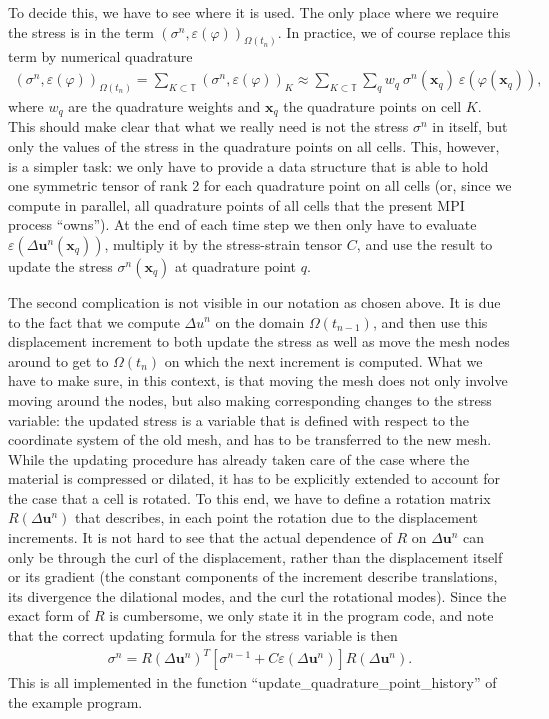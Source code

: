 \documentclass{article}
\renewcommand{\vec}[1]{\mathbf{#1}}
\begin{document}
To decide this, we have to see where it is used. The only place where we
require the stress is in the term
$(\sigma^n,\varepsilon(\varphi))_{\Omega(t_n)}$. In practice, we of
course replace this term by numerical quadrature
\begin{gather*}
  (\sigma^n,\varepsilon(\varphi))_{\Omega(t_n)}
  =
  \sum_{K\subset {\mathbb T}}
  (\sigma^n,\varepsilon(\varphi))_K
  \approx
  \sum_{K\subset {\mathbb T}}
  \sum_q
  w_q \ \sigma^n(\vec x_q) \ \varepsilon(\varphi(\vec x_q)),
\end{gather*}
where $w_q$ are the quadrature weights and $\vec x_q$ the quadrature points on
cell $K$. This should make clear that what we really need is not the stress
$\sigma^n$ in itself, but only the values of the stress in the quadrature
points on all cells. This, however, is a simpler task: we only have to provide
a data structure that is able to hold one symmetric tensor of rank 2 for each
quadrature point on all cells (or, since we compute in parallel, all
quadrature points of all cells that the present MPI process ``owns''). At the
end of each time step we then only have to evaluate $\varepsilon(\Delta \vec
u^n(\vec x_q))$, multiply it by the stress-strain tensor $C$, and use the
result to update the stress $\sigma^n(\vec x_q)$ at quadrature point $q$.

The second complication is not visible in our notation as chosen above. It is
due to the fact that we compute $\Delta u^n$ on the domain $\Omega(t_{n-1})$,
and then use this displacement increment to both update the stress as well as
move the mesh nodes around to get to $\Omega(t_n)$ on which the next increment
is computed. What we have to make sure, in this context, is that moving the
mesh does not only involve moving around the nodes, but also making
corresponding changes to the stress variable: the updated stress is a variable
that is defined with respect to the coordinate system of the old mesh, and has
to be transferred to the new mesh. While the updating procedure has already
taken care of the case where the material is compressed or dilated, it has to
be explicitly extended to account for the case that a cell is rotated. To this
end, we have to define a rotation matrix $R(\Delta \vec u^n)$ that describes,
in each point the rotation due to the displacement increments. It is not hard
to see that the actual dependence of $R$ on $\Delta \vec u^n$ can only be
through the curl of the displacement, rather than the displacement itself or
its gradient (the constant components of the increment describe translations,
its divergence the dilational modes, and the curl the rotational modes). Since
the exact form of $R$ is cumbersome, we only state it in the program code, and
note that the correct updating formula for the stress variable is then
\begin{gather*}
  \sigma^n
  = 
  R(\Delta \vec u^n)^T 
  [\sigma^{n-1} + C \varepsilon (\Delta \vec u^n)]
  R(\Delta \vec u^n).
\end{gather*}
This is all implemented in the function
``update\_\-quadrature\_\-point\_history'' of the example program.
\end{document}
